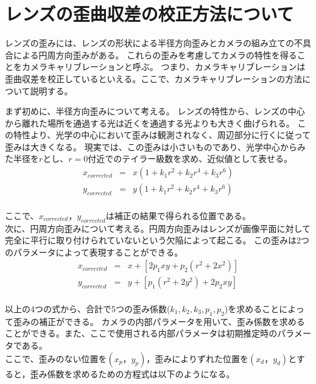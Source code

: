 \section{レンズの歪曲収差の校正方法について}
レンズの歪みには、レンズの形状による半径方向歪みとカメラの組み立ての不具合による円周方向歪みがある。
これらの歪みを考慮してカメラの特性を得ることをカメラキャリブレーションと呼ぶ。
つまり、カメラキャリブレーションは歪曲収差を校正しているといえる。ここで、カメラキャリブレーションの方法について説明する。

まず初めに、半径方向歪みについて考える。
レンズの特性から、レンズの中心から離れた場所を通過する光は近くを通過する光よりも大きく曲げられる。
この特性より、光学の中心において歪みは観測されなく、周辺部分に行くに従って歪みは大きくなる。
現実では、この歪みは小さいものであり、光学中心からみた半径を\begin{math}{r}\end{math}とし、\begin{math}{r=0}\end{math}付近でのテイラー級数を求め、近似値として表せる。
\begin{eqnarray}
  x_{corrected} & = & x(1+k_1 r^2+k_2 r^4+k_3 r^6) \\
  y_{corrected} & = & y(1+k_1 r^2+k_2 r^4+k_3 r^6)
\end{eqnarray}\\
ここで、\begin{math}x_{corrected}，y_{corrected}は補正の結果で得られる位置である。\end{math} \\
次に、円周方向歪みについて考える。円周方向歪みはレンズが画像平面に対して完全に平行に取り付けられていないという欠陥によって起こる。
この歪みは2つのパラメータによって表現することができる。
\begin{eqnarray}
  x_{corrected} & = & x + [ 2p_1xy + p_2 (r^2 + 2x^2) ] \\
  y_{corrected} & = & y + [ p_1(r^2+2y^2) + 2p_2xy]
\end{eqnarray}\\
以上の4つの式から、合計で5つの歪み係数(\begin{math}k_1,k_2,k_3,p_1,p_2\end{math})を求めることによって歪みの補正ができる。
カメラの内部パラメータを用いて、歪み係数を求めることができる。また、ここで使用される内部パラメータは初期推定時のパラメータである。\\
ここで、歪みのない位置を\begin{math}(x_{p}，y_{p})\end{math}，歪みによりずれた位置を\begin{math}(x_{d}，y_{d})\end{math}とすると，歪み係数を求めるための方程式は以下のようになる。
